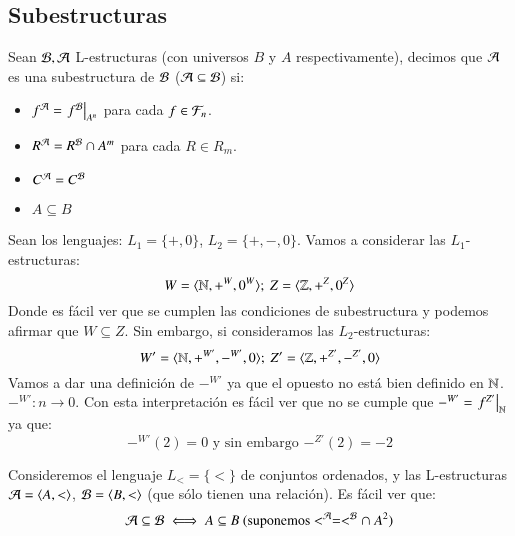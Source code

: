 \subsection{Subestructuras}
\begin{dfn}
    Sean $\mathcal{B}, \mathcal{A}$ L-estructuras (con universos $B$ y $A$ respectivamente), decimos que $\mathcal{A}$ es una subestructura de $\mathcal{B}$ ($\mathcal{A} \subseteq \mathcal{B}$) si:
    \begin{itemize}
        \item $f^{\mathcal{A}} = \left. f^{\mathcal{B}} \right|_{A^n}$ para cada $f \in \mathcal{F}_n$.
        \item $R^{\mathcal{A}} = R^{\mathcal{B}} \cap A^m$ para cada $R \in R_m$.
        \item $C^{\mathcal{A}} = C^{\mathcal{B}}$
        \item $A \subseteq B$
    \end{itemize}
\end{dfn}
\begin{eg}
    Sean los lenguajes: $L_1 = \{+, 0\}$, $L_2 = \{+, -, 0\}$. Vamos a considerar las $L_1$-estructuras:
    $$
        W = \langle\mathbb{N}, +^W, 0^W\rangle;\ Z = \langle\mathbb{Z}, +^Z, 0^Z\rangle
    $$
    Donde es fácil ver que se cumplen las condiciones de subestructura y podemos afirmar que $W \subseteq Z$. Sin embargo, si consideramos las $L_2$-estructuras:
    $$
        W' = \langle\mathbb{N}, +^{W'}, -^{W'}, 0\rangle;\ Z' = \langle\mathbb{Z}, +^{Z'}, -^{Z'}, 0\rangle
    $$
    Vamos a dar una definición de $-^{W'}$ ya que el opuesto no está bien definido en $\mathbb{N}$. $-^{W'}: n \to 0$. Con esta interpretación es fácil ver que no se cumple que $-^{W'} = \left. f^{Z'} \right|_{\mathbb{N}}$ ya que:
    $$
        -^{W'}(2) = 0 \text{ y sin embargo } -^{Z'}(2)=-2
    $$
\end{eg}
\begin{obs}
    Consideremos el lenguaje $L_< = \{<\}$ de conjuntos ordenados, y las L-estructuras $\mathcal{A} = \langle A, <\rangle$, $\mathcal{B} = \langle B, <\rangle$ (que sólo tienen una relación). Es fácil ver que:
    $$
        \mathcal{A} \subseteq \mathcal{B} \iff A \subseteq B \text{ (suponemos $<^{\mathcal{A}} = <^{\mathcal{B}} \cap\ A^2$)}
    $$
\end{obs}


